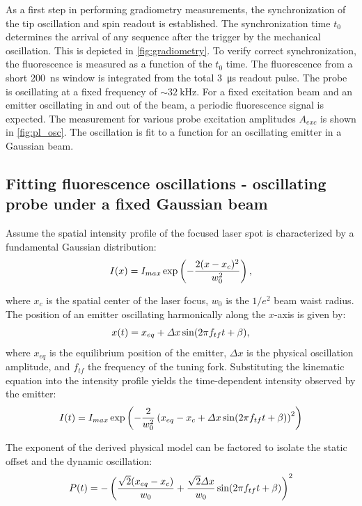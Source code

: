 As a first step in performing gradiometry measurements, the synchronization of the tip oscillation and spin readout is established. The synchronization time $t_0$ determines the arrival of any sequence after the trigger by the mechanical oscillation. This is depicted in \cref{fig:gradiometry}. To verify correct synchronization, the fluorescence is measured as a function of the $t_0$ time. The fluorescence from a short \qty{200}{\nano\second} window is integrated from the total \qty{3}{\micro\second} readout pulse. The probe is oscillating at a fixed frequency of $\sim\qty{32}{\kilo\hertz}$. For a fixed excitation beam and an emitter oscillating in and out of the beam, a periodic fluorescence signal is expected. The measurement for various probe excitation amplitudes $A_{exc}$ is shown in \cref{fig:pl_osc}. The oscillation is fit to a function for an oscillating emitter in a Gaussian beam.%
\subsection*{Fitting fluorescence oscillations - oscillating probe under a fixed Gaussian beam}\label{app:pl_osc}

Assume the spatial intensity profile of the focused laser spot is characterized by a fundamental Gaussian distribution:
\begin{equation}
    \centering
    I(x) = I_{max} \exp\left(-\frac{2(x - x_c)^2}{w_0^2}\right),
\end{equation}

where $x_c$ is the spatial center of the laser focus, $w_0$ is the $1/e^2$ beam waist radius. The position of an emitter oscillating harmonically along the $x$-axis is given by:
\begin{equation}
    \centering
    x(t) = x_{eq} + \Delta x \sin(2 \pi f_{tf} t + \beta),
\end{equation}
where $x_{eq}$ is the equilibrium position of the emitter, $\Delta x$ is the physical oscillation amplitude, and $f_{tf}$ the frequency of the tuning fork. Substituting the kinematic equation into the intensity profile yields the time-dependent intensity observed by the emitter:
\begin{equation}
    \centering
    I(t) = I_{max} \exp\left(-\frac{2}{w_0^2}\left(x_{eq} - x_c + \Delta x \sin(2 \pi f_{tf} t + \beta)\right)^2\right)
\end{equation}

The exponent of the derived physical model can be factored to isolate the static offset and the dynamic oscillation:
\begin{equation}
    \centering
    P(t) = -\left( \frac{\sqrt{2}(x_{eq} - x_c)}{w_0} + \frac{\sqrt{2}\Delta x}{w_0} \sin(2 \pi f_{tf} t + \beta) \right)^2
\end{equation}

